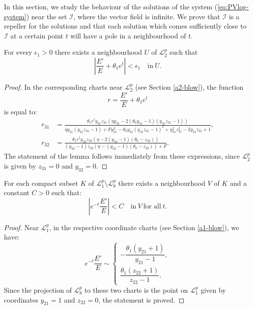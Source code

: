 In this section, we study the behaviour of the solutions of the system (\ref{eq:PVlog-system}) near the set $\mathcal{I}$, where the vector field is infinite.
We prove that $\mathcal{I}$ is a repeller for the solutions and that each solution which comes sufficiently close to $\mathcal{I}$ at a certain point $t$ will have a pole in a neighbourhood of $t$.

\begin{lemma}\label{lemma:L2}
For every $\epsilon_1>0$ there exists a neighbourhood $U$ of $\mathcal{L}_2^p$ such that
$$
\left|
\frac{E'}{E}+\theta_1 e^t
\right|
<\epsilon_1
\quad
\text{in}\ U.
$$
\end{lemma}

\begin{proof}
In the corresponding charts near $\mathcal{L}_2^p$ (see Section \ref{a2-blow}), the function
$$
r=\frac{E'}{E}+\theta_1 e^t
$$
is equal to:
$$
\begin{aligned}
r_{31} &= \frac{\theta_1 e^t y_{31} z_{31} (\eta y_{31}-2 (\theta_0 y_{31}-1) (y_{31} z_{31}-1))}
{\eta y_{31} (y_{31} z_{31}-1)+F y_{31}^2-\theta_0 y_{31} (y_{31} z_{31}-1)^2+y_{31}^2 z_{31}^2-2 y_{31} z_{31}+1},
\\
r_{32} &= \frac{\theta_1 e^t y_{32} z_{32} (\eta-2 (y_{32}-1) (\theta_0-z_{32}))}
{(y_{32}-1) z_{32} (\eta-(y_{32}-1) (\theta_0-z_{32}))+F}.
\end{aligned}
$$
The statement of the lemma follows immediately from these expressions, since  $\mathcal{L}_2^p$ is given by $z_{31}=0$ and $y_{32}=0$.
\end{proof}


\begin{lemma}\label{lemma:L1}
For each compact subset $K$ of
$\mathcal{L}_1^p\setminus\mathcal{L}_8^p$
there exists a neighbourhood $V$ of $K$ and a constant $C>0$ such that:
$$
\left| e^{-t}\frac{E'}{E} \right|<C
\quad
\text{in}\ V\ \text{for all}\ t.
$$
\end{lemma}

\begin{proof}
Near $\mathcal{L}_1^p$, in the respective coordinate charts (see Section \ref{a1-blow}), we have:
$$
e^{-t}\frac{E'}{E}\sim
\begin{cases}
-\dfrac{\theta_1 (y_{21}+1)}{y_{21}-1},
\\
\dfrac{ \theta_1 (z_{22}+1)}{z_{22}-1}.
\end{cases}
$$
Since the projection of $\mathcal{L}_8^p$ to these two charts is the point on $\mathcal{L}_1^p$ given by coordinates $y_{21}=1$ and $z_{22}=0$, the statement is proved.
\end{proof}

